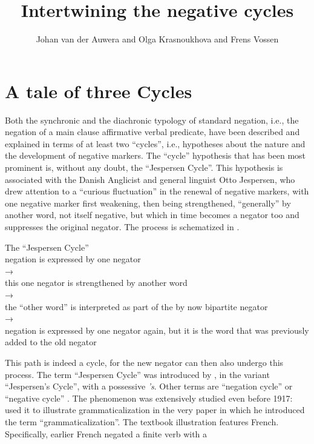 ﻿\documentclass[output=paper]{langsci/langscibook}
\title{Intertwining the negative cycles}
\author{Johan van der Auwera\affiliation{University of Antwerp} and
Olga Krasnoukhova\affiliation{University of Antwerp} and
Frens Vossen\affiliation{University of Antwerp}
}
\begin{document}
\section{A tale of three Cycles}\label{sec:int-1}

Both the synchronic and the diachronic typology of standard negation, i.e.,
the negation of a main clause affirmative verbal predicate, have been
described and explained in terms of at least two ``cycles'',  i.e., hypotheses
about the nature and the development of negative markers. The ``cycle''
hypothesis that has been most prominent is, without any doubt, the
``Jespersen Cycle''. This hypothesis is associated with the Danish Anglicist
and general linguist Otto Jespersen, who drew attention to a ``curious
fluctuation'' \parencite[4]{Jespersen1917} in the renewal of negative markers,
with one negative marker first weakening, then being strengthened,
``generally'' by another word, not itself negative, but which in time becomes
a negator too and suppresses the original negator. The process is
schematized in . 
%
\begin{exe}\ex\label{ex:int-jespersen}
          The ``Jespersen Cycle'' \\[1ex]
negation is expressed by one negator\\ 
→\\
this one negator is strengthened by another word\\ 
→\\ 
the ``other word'' is interpreted as part of the by now bipartite negator\\
→\\ 
negation is expressed by one negator again, but it is the word that was previously added to the old negator 
    \end{exe}
%
This path is indeed a cycle, for the new negator can then also undergo this
process. The term ``Jespersen Cycle'' was introduced by \textcite{Dahl1979}, in
the variant ``Jespersen's Cycle'', with a possessive \textit{'s}. Other
terms are ``negation cycle'' \parencite[e.g.][]{Schwegler1983} or ``negative
cycle'' \parencites(e.g.)(){Gelderen2011}{Mithun2016}. The
phenomenon was extensively studied even before 1917: \textcite{Meillet1912}
used it to illustrate grammaticalization in the very paper in which he
introduced the term ``grammaticalization''. The textbook illustration
features French. Specifically, earlier French negated a finite verb with a
\end{document}
